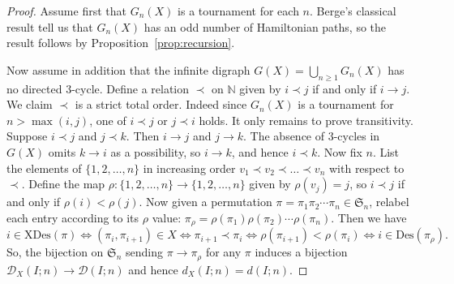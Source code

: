 \documentclass[12pt]{amsart}
\theoremstyle{definition}
\theoremstyle{remark}
\newcommand{\XD}{\mathrm{XDes}}
\newcommand{\Des}{\mathrm{Des}}
\newcommand{\Asc}{\mathrm{Asc}}
\begin{document}
\begin{proof}
Assume first that \(G_n(X)\) is a tournament for each \(n\). Berge's classical result \cite{moon-tournaments,grinberg-stanley-redei-berge} tell us that $G_n(X)$ has an odd number of Hamiltonian paths, so the result follows by Proposition~\ref{prop:recursion}.

Now assume in addition that the infinite digraph $G(X)=\bigcup_{n\ge 1}G_n(X)$ has no directed $3$-cycle. Define a relation $\prec$ on $\mathbb{N}$ given by $i \prec j$ if and only if $i \to j$. We claim $\prec$ is a strict total order. Indeed since $G_n(X)$ is a tournament for $n>\max(i,j)$, one of $i \prec j$ or $j \prec i$ holds. It only remains to prove transitivity. Suppose $i \prec j$ and $j \prec k$. Then $i \to j$ and $j \to k$. The absence of $3$-cycles in $G(X)$ omits $k \to i$ as a possibility, so $i \to k$, and hence $i \prec k$. Now fix $n$. List the elements of $\{1,2,\ldots,n\}$ in increasing order $v_1 \prec v_2 \prec \ldots \prec v_n$ with respect to $\prec$. Define the map $\rho:\{1,2,\ldots,n\} \to \{1,2,\ldots,n\}$ given by $\rho(v_j)=j$, so $i \prec j$ if and only if $\rho(i)<\rho(j)$. Now given a permutation $\pi = \pi_1\pi_2 \cdots \pi_n \in \mathfrak{S}_n$, relabel each entry according to its $\rho$ value: $\pi_{\rho} = \rho(\pi_1)\rho(\pi_2) \cdots \rho(\pi_n)$. Then we have
\[
i \in \XD(\pi) \Longleftrightarrow (\pi_i,\pi_{i+1}) \in X \Longleftrightarrow \pi_{i+1} \prec \pi_i \Longleftrightarrow \rho(\pi_{i+1}) < \rho(\pi_i) \Longleftrightarrow i \in \text{Des}(\pi_{\rho}).
\]
So, the bijection on $\mathfrak{S}_n$ sending $\pi \to \pi_{\rho}$ for any $\pi$ induces a bijection $\mathcal{D}_X(I;n) \to \mathcal{D}(I;n)$ and hence $d_X(I;n)=d(I;n)$.
\end{proof}
\end{document}

